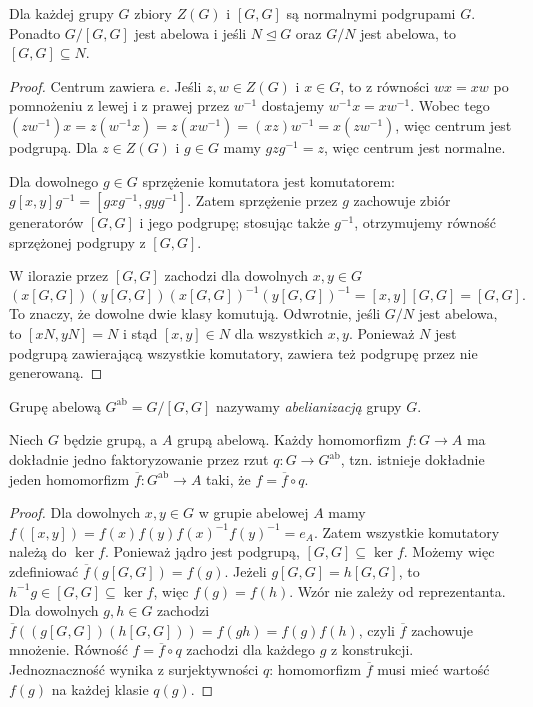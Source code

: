 \begin{lemat}
\label{aa:lem:komutatory}
Dla każdej grupy $G$ zbiory $Z(G)$ i $[G,G]$ są normalnymi
podgrupami $G$. Ponadto $G/[G,G]$ jest abelowa i jeśli
$N\trianglelefteq G$ oraz $G/N$ jest abelowa, to $[G,G]\subseteq N$.
\end{lemat}
\begin{proof}
Centrum zawiera $e$. Jeśli $z,w\in Z(G)$ i $x\in G$,
to z równości $wx=xw$ po pomnożeniu z lewej i z prawej
przez $w^{-1}$ dostajemy $w^{-1}x=xw^{-1}$. Wobec tego
$(zw^{-1})x=z(w^{-1}x)=z(xw^{-1})=(xz)w^{-1}
=x(zw^{-1})$, więc centrum jest podgrupą.
Dla $z\in Z(G)$ i $g\in G$ mamy $gzg^{-1}=z$,
więc centrum jest normalne.

Dla dowolnego $g\in G$ sprzężenie komutatora jest komutatorem:
$g[x,y]g^{-1}=[gxg^{-1},gyg^{-1}]$.
Zatem sprzężenie przez $g$ zachowuje zbiór generatorów
$[G,G]$ i jego podgrupę; stosując także $g^{-1}$,
otrzymujemy równość sprzężonej podgrupy z $[G,G]$.

W ilorazie przez $[G,G]$ zachodzi dla dowolnych $x,y\in G$
\[
 (x[G,G])(y[G,G])(x[G,G])^{-1}(y[G,G])^{-1}
 =[x,y][G,G]=[G,G].
\]
To znaczy, że dowolne dwie klasy komutują.
Odwrotnie, jeśli $G/N$ jest abelowa, to
$[xN,yN]=N$ i stąd $[x,y]\in N$ dla wszystkich $x,y$.
Ponieważ $N$ jest podgrupą zawierającą wszystkie komutatory,
zawiera też podgrupę przez nie generowaną.
\end{proof}

\begin{definicja}[Abelianizacja]
\label{aa:def:abelianizacja}
Grupę abelową $G^{\mathrm{ab}}=G/[G,G]$ nazywamy
\emph{abelianizacją} grupy $G$.
\end{definicja}

\begin{twierdzenie}
\label{aa:tw:abelianizacja}
Niech $G$ będzie grupą, a $A$ grupą abelową.
Każdy homomorfizm $f:G\to A$ ma dokładnie jedno
faktoryzowanie przez rzut $q:G\to G^{\mathrm{ab}}$,
tzn. istnieje dokładnie jeden homomorfizm
$\overline f:G^{\mathrm{ab}}\to A$ taki, że $f=\overline f\circ q$.
\end{twierdzenie}
\begin{proof}
Dla dowolnych $x,y\in G$ w grupie abelowej $A$ mamy
$f([x,y])=f(x)f(y)f(x)^{-1}f(y)^{-1}=e_A$.
Zatem wszystkie komutatory należą do $\ker f$.
Ponieważ jądro jest podgrupą, $[G,G]\subseteq\ker f$.
Możemy więc zdefiniować
$\overline f(g[G,G])=f(g)$.
Jeżeli $g[G,G]=h[G,G]$, to $h^{-1}g\in[G,G]\subseteq\ker f$,
więc $f(g)=f(h)$. Wzór nie zależy od reprezentanta.
Dla dowolnych $g,h\in G$ zachodzi
$\overline f((g[G,G])(h[G,G]))=f(gh)=f(g)f(h)$,
czyli $\overline f$ zachowuje mnożenie.
Równość $f=\overline f\circ q$
zachodzi dla każdego $g$ z konstrukcji.
Jednoznaczność wynika z surjektywności $q$: homomorfizm
$\overline f$ musi mieć wartość $f(g)$ na każdej klasie $q(g)$.
\end{proof}

